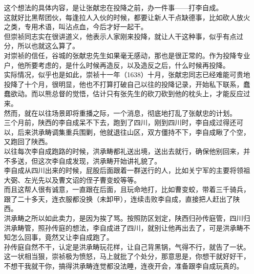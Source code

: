 \begin{multicols}{\theparacolNo}
这个想法的具体内容，是让张献忠在投降之前，办一件事——打李自成。\\

这就好比黑帮团伙，每逢拉人入伙的时候，都要让新人干点缺德事，比如砍人放火之类，专用术语，叫沾点血，今后才好一起干。\\

但崇祯同志实在很讲道义，他表示人家刚来投降，就让人干这种事，似乎有点过分，所以也就这么算了。\\

对崇祯的信任，谷城的张献忠先生如果毫无感动，那也是很正常的。作为投降专业户，他所要考虑的，是什么时候再造反，以及造反之后，什么时候再投降。\\

实际情况，似乎也是如此，崇祯十一年（1638）十月，张献忠同志已经难能可贵地投降了十个月，很明显，他也不打算打破自己以往的投降记录，开始私下联系，蠢蠢欲动。而以熊总督的觉悟，估计只有张先生的砍刀砍到他的枕头上，才能反应过来。\\

然而，就在以往场景即将重播之际，一个消息，彻底地打乱了张献忠的计划。\\

三个月前，陕西的李自成呆不下去，跑到了四川，刚到四川时，李自成过得还可以，后来洪承畴调集重兵围剿，他就退往山区，双方僵持不下，李自成瞅了个空，又跑回了陕西。\\

以往每次李自成跑路的时候，洪承畴都礼送出境，送出去就行，确保他别回来，并不多送，但这次李自成发现，洪承畴开始讲礼貌了。\\

李自成从四川出来的时候，屁股后面跟着一群送行的人，比如关宁军的主要将领祖大弼、左光先以及曹文诏的侄子曹变蛟等等。\\

而且这帮人很有诚意，一直跟在后面，且玩命地打，比如曹变蛟，带着三千骑兵，跟了二十多天，连衣服都没换（未卸甲），连续击败李自成，直接把人赶出了陕西。\\

洪承畴之所以如此卖力，是因为挨了骂。按照防区划定，陕西归孙传庭管，四川归洪承畴管，照孙传庭的想法，李自成进了四川，就别让他再出去了，可是洪承畴不知怎么回事，竟然又让李自成跑了。\\

孙传庭自然不干，认定是洪承畴玩花样，让自己背黑锅，气得不行，就告了一状。\\

这一状相当狠，崇祯极为愤怒，马上就批了个处分，那意思是，你想干就好好干，不想干我就干你，搞得洪承畴连觉都没法睡，连夜开会，准备跟李自成玩真的。\\


\end{multicols}
